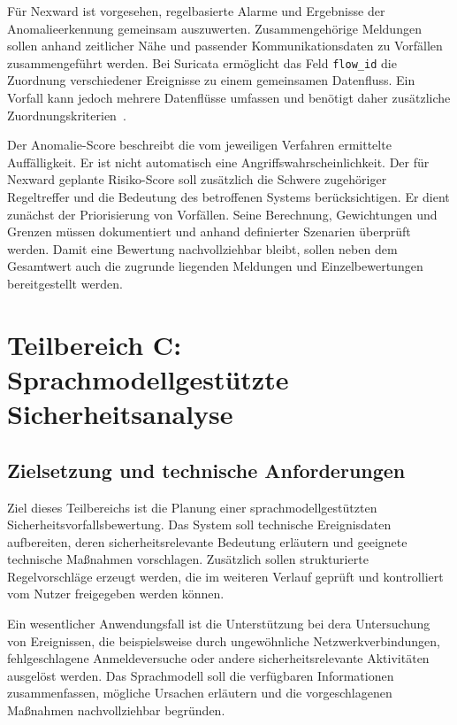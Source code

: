 Für Nexward ist vorgesehen, regelbasierte Alarme und Ergebnisse der Anomalieerkennung gemeinsam auszuwerten. Zusammengehörige Meldungen sollen anhand zeitlicher Nähe und passender Kommunikationsdaten zu Vorfällen zusammengeführt werden. Bei Suricata ermöglicht das Feld \texttt{flow\_id} die Zuordnung verschiedener Ereignisse zu einem gemeinsamen Datenfluss. Ein Vorfall kann jedoch mehrere Datenflüsse umfassen und benötigt daher zusätzliche Zuordnungskriterien~\cite{raichle-suricata-eve}.

Der Anomalie-Score beschreibt die vom jeweiligen Verfahren ermittelte Auffälligkeit. Er ist nicht automatisch eine Angriffswahrscheinlichkeit. Der für Nexward geplante Risiko-Score soll zusätzlich die Schwere zugehöriger Regeltreffer und die Bedeutung des betroffenen Systems berücksichtigen. Er dient zunächst der Priorisierung von Vorfällen. Seine Berechnung, Gewichtungen und Grenzen müssen dokumentiert und anhand definierter Szenarien überprüft werden. Damit eine Bewertung nachvollziehbar bleibt, sollen neben dem Gesamtwert auch die zugrunde liegenden Meldungen und Einzelbewertungen bereitgestellt werden.


\newpage
\section{Teilbereich C: Sprachmodellgestützte Sicherheitsanalyse}
\label{subsec:teilbereich-c}

\subsection{Zielsetzung und technische Anforderungen}

Ziel dieses Teilbereichs ist die Planung einer
sprachmodellgestützten Sicherheitsvorfallsbewertung.
Das System soll technische Ereignisdaten aufbereiten,
deren sicherheitsrelevante Bedeutung erläutern und geeignete
technische Maßnahmen vorschlagen. Zusätzlich
sollen strukturierte Regelvorschläge erzeugt werden, die im weiteren
Verlauf geprüft und kontrolliert vom Nutzer freigegeben werden können.

Ein wesentlicher Anwendungsfall ist die Unterstützung bei dera
Untersuchung von Ereignissen, die beispielsweise durch ungewöhnliche
Netzwerkverbindungen, fehlgeschlagene Anmeldeversuche oder andere
sicherheitsrelevante Aktivitäten ausgelöst werden. Das Sprachmodell
soll die verfügbaren Informationen zusammenfassen, mögliche
Ursachen erläutern und die vorgeschlagenen Maßnahmen nachvollziehbar
begründen.

